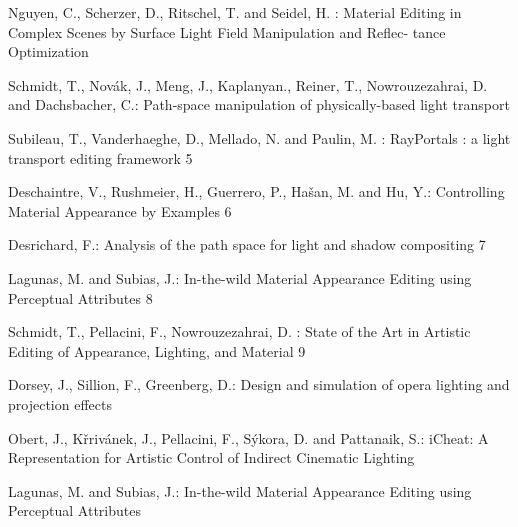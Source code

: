 \documentclass[runningheads]{llncs}
\begin{document}
%
%
%
% 
% 
%
\begin{thebibliography}{8}
\bibitem{}
Nguyen, C., Scherzer, D., Ritschel, T. and Seidel, H. : Material Editing in Complex Scenes by Surface Light Field Manipulation and Reflec-
tance Optimization

\bibitem{}
Schmidt, T., Novák, J., Meng, J., Kaplanyan., Reiner, T., Nowrouzezahrai, D. and Dachsbacher, C.: Path-space manipulation of physically-based light transport

\bibitem{}
Subileau, T., Vanderhaeghe, D., Mellado, N. and Paulin, M. : RayPortals : a light transport editing framework 5

\bibitem{}
Deschaintre, V., Rushmeier, H., Guerrero, P., Hašan, M. and Hu, Y.: Controlling Material Appearance by Examples 6

\bibitem{}
Desrichard, F.: Analysis of the path space for light and shadow compositing 7

\bibitem{}
Lagunas, M. and Subias, J.: In-the-wild Material Appearance Editing using Perceptual Attributes 8

\bibitem{}
Schmidt, T., Pellacini, F., Nowrouzezahrai, D. : State of the Art in Artistic Editing of Appearance, Lighting, and Material 9

\bibitem{}
Dorsey, J., Sillion, F., Greenberg, D.: Design and simulation of opera lighting and projection effects

\bibitem{}
Obert, J., Křrivánek, J., Pellacini, F., Sýkora, D. and Pattanaik, S.: iCheat: A Representation for Artistic Control of Indirect Cinematic Lighting

\bibitem{}
Lagunas, M. and Subias, J.: In-the-wild Material Appearance Editing using Perceptual Attributes

\end{thebibliography}
\end{document}
